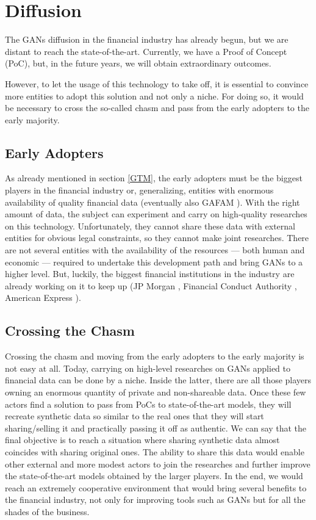 \documentclass[runningheads]{llncs}
\begin{document}
\section{Diffusion}\label{adoption}
The GANs diffusion in the financial industry has already begun, but we are distant to reach the state-of-the-art. Currently, we have a Proof of Concept (PoC), but, in the future years, we will obtain extraordinary outcomes.

However, to let the usage of this technology to take off, it is essential to convince more entities to adopt this solution and not only a niche. For doing so, it would be necessary to cross the so-called chasm and pass from the early adopters to the early majority.

\subsection{Early Adopters}
As already mentioned in section \ref{GTM}, the early adopters must be the biggest players in the financial industry or, generalizing, entities with enormous availability of quality financial data (eventually also GAFAM \cite{GAFAM}). With the right amount of data, the subject can experiment and carry on high-quality researches on this technology. Unfortunately, they cannot share these data with external entities for obvious legal constraints, so they cannot make joint researches. There are not several entities with the availability of the resources — both human and economic — required to undertake this development path and bring GANs to a higher level. But, luckily, the biggest financial institutions in the industry are already working on it to keep up (JP Morgan \cite{JP}, Financial Conduct Authority \cite{sandbox,FCA}, American Express \cite{AMEX}).

\subsection{Crossing the Chasm}
Crossing the chasm and moving from the early adopters to the early majority is not easy at all. Today, carrying on high-level researches on GANs applied to financial data can be done by a niche. Inside the latter, there are all those players owning an enormous quantity of private and non-shareable data. Once these few actors find a solution to pass from PoCs to state-of-the-art models, they will recreate synthetic data so similar to the real ones that they will start sharing/selling it and practically passing it off as authentic. We can say that the final objective is to reach a situation where sharing synthetic data almost coincides with sharing original ones. The ability to share this data would enable other external and more modest actors to join the researches and further improve the state-of-the-art models obtained by the larger players. In the end, we would reach an extremely cooperative environment that would bring several benefits to the financial industry, not only for improving tools such as GANs but for all the shades of the business.
\end{document}

